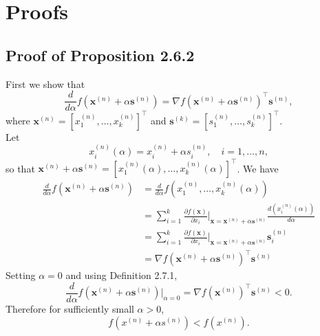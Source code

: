 \documentclass[honours,12pt]{unswthesis}
\numberwithin{equation}{section}
\theoremstyle{definition}
\begin{document}
\clearpage
{}





\newpage
\appendix
\chapter{Proofs}\label{app:A}
\section{Proof of Proposition 2.6.2}\label{app:A.1}
First we show that
\[\frac{d}{d\alpha}f\left(\bm{x}^{(n)}+\alpha \bm{s}^{(n)}\right)=\nabla f\left(\bm{x}^{(n)}+\alpha \bm{s}^{(n)}\right)^\top \bm{s}^{(n)},\]
where $\bm{x}^{(n)}=\left[x_1^{(n)},\dots,x_k^{(n)}\right]^\top$ and $\bm{s}^{(k)}=\left[s_1^{(n)},\dots,s_k^{(n)}\right]^\top$.\\
Let
\[x_i^{(n)}(\alpha)=x_i^{(n)}+\alpha s_i^{(n)},\quad i=1,\dots,n,\]
so that $\bm{x}^{(n)}+\alpha \bm{s}^{(n)}=\left[x_1^{(n)}(\alpha),\dots,x_k^{(n)}(\alpha)\right]^\top$.
We have
\begin{align*}
\frac{d}{d\alpha}f\left(\bm{x}^{(n)}+\alpha\bm{s}^{(n)}\right)&= \frac{d}{d\alpha}f\left(x_1^{(n)},\dots,x_k^{(n)}(\alpha)\right)\\
&= \sum^k_{i=1}\frac{\partial f(\bm{x})}{\partial x_i}|_{\bm{x}=\bm{x}^{(n)}+\alpha \bm{s}^{(n)}}\frac{d\left(x_i^{(n)}(\alpha)\right)}{d\alpha}\\
&=\sum_{i=1}^k\frac{\partial f(\bm{x})}{\partial x_i}|_{\bm{x}=\bm{x}^{(n)}+\alpha \bm{s}^{(n)}}\bm{s}_i^{(n)}\\
&=\nabla f\left(\bm{x}^{(n)}+\alpha \bm{s}^{(n)}\right)^\top \bm{s}^{(n)}
\end{align*}
Setting $\alpha=0$ and using Definition 2.7.1,
\[\frac{d}{d\alpha}f\left(\bm{x}^{(n)}+\alpha\bm{s}^{(n)}\right)|_{\alpha=0}=\nabla f\left(\bm{x}^{(n)}\right)^\top \bm{s}^{(n)}<0.\]
Therefore for sufficiently small $\alpha>0$,
\[f\left(x^{(n)}+\alpha s^{(n)}\right)<f\left(x^{(n)}\right).\]
\end{document}
